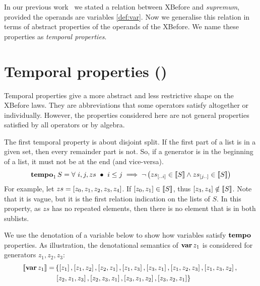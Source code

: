 In our previous work~\cite{DM2015} we stated a relation between \ac{XBefore} and \emph{supremum}, provided the operands are variables \cref{def:var}.
Now we generalise this relation in terms of abstract properties of the operands of the \ac{XBefore}.
We name these properties as \emph{temporal properties}.

\section[Temporal properties (tempo)]{Temporal properties (\emph{\tempotext})}
\label{sec:temporal-properties}

Temporal properties give a more abstract and less restrictive shape on the \ac{XBefore} laws.
They are abbreviations that some operators satisfy altogether or individually.
However, the properties considered here are not general properties satisfied by all operators or by \ac{algebra}. 

The first temporal property is about disjoint split.
If the first part of a list is in a given set, then every remainder part is not.
So, if a generator is in the beginning of a list, it must not be at the end (and vice-versa).
%
\begin{equation}
\tempo[1]{S} = \forall~ i, j, zs ~\bullet~
i \le j \implies
\lnot \left(
\sliceright{zs}{i} \in \denote{S} \land \sliceleft{zs}{j} \in \denote{S}
\right)\label{def:tempo1}
\end{equation}
%
For example, let $zs = \listsin{z_0,z_1,z_2,z_3,z_4}$.
If $\listsin{z_0,z_1} \in \denote{S}$, thus $\listsin{z_3,z_4} \notin \denote{S}$.
Note that it is vague, but it is the first relation indication on the lists of $S$.
In this property, as $zs$ has no repeated elements, then there is no element that is in both sublists.

We use the denotation of a variable below to show how variables satisfy $\tempo[]{}$ properties.
As illustration, the denotational semantics of $\var{z_1}$ is considered for generators $z_1,z_2,z_3$:
%
\begin{align}
\denote{\var{z_1}} = & 
\left\{
\listsin{z_1}, 
\listsin{z_1,z_2},\listsin{z_2,z_1},
\listsin{z_1,z_3},\listsin{z_3,z_1},
\listsin{z_1,z_2,z_3},\listsin{z_1,z_3,z_2},
\right.
\nonumber\\
&
\left.
\listsin{z_2,z_1,z_3},\listsin{z_2,z_3,z_1},
\listsin{z_3,z_1,z_2},\listsin{z_3,z_2,z_1}
\right\}
\end{align}

